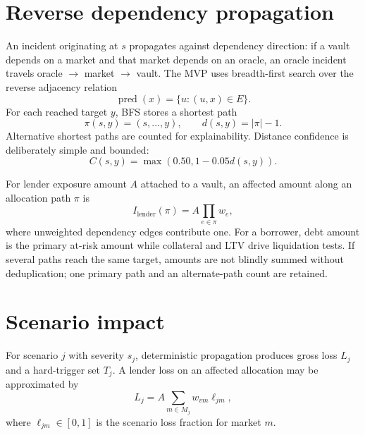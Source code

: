 \documentclass[11pt,a4paper]{article}
\begin{document}
\section{Reverse dependency propagation}

An incident originating at $s$ propagates against dependency direction: if a
vault depends on a market and that market depends on an oracle, an oracle
incident travels oracle $\rightarrow$ market $\rightarrow$ vault.  The MVP uses
breadth-first search over the reverse adjacency relation
\begin{equation}
\operatorname{pred}(x)=\{u:(u,x)\in E\}.
\end{equation}
For each reached target $y$, BFS stores a shortest path
\begin{equation}
\pi(s,y)=(s,\ldots,y),\qquad d(s,y)=|\pi|-1.
\end{equation}
Alternative shortest paths are counted for explainability.  Distance confidence
is deliberately simple and bounded:
\begin{equation}
C(s,y)=\max(0.50,1-0.05d(s,y)).
\end{equation}

For lender exposure amount $A$ attached to a vault, an affected amount along an
allocation path $\pi$ is
\begin{equation}
I_{\mathrm{lender}}(\pi)=A\prod_{e\in\pi}w_e,
\end{equation}
where unweighted dependency edges contribute one.  For a borrower, debt amount
is the primary at-risk amount while collateral and LTV drive liquidation tests.
If several paths reach the same target, amounts are not blindly summed without
deduplication; one primary path and an alternate-path count are retained.

\section{Scenario impact}

For scenario $j$ with severity $s_j$, deterministic propagation produces gross
loss $L_j$ and a hard-trigger set $T_j$.  A lender loss on an affected allocation
may be approximated by
\begin{equation}
L_j=A\sum_{m\in M_j}w_{vm}\ell_{jm},
\end{equation}
where $\ell_{jm}\in[0,1]$ is the scenario loss fraction for market $m$.
\end{document}
